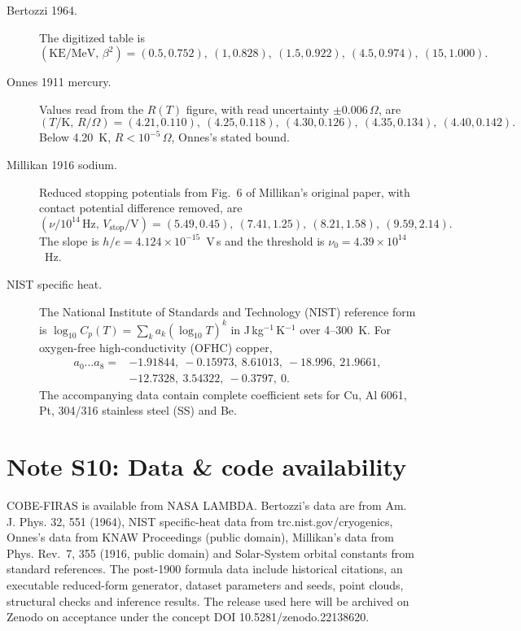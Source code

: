 \documentclass{article}
\begin{document}
\begin{description}
\item[Bertozzi 1964.] The digitized table is
\[
(\mathrm{KE}/\mathrm{MeV},\, \beta^{2}) = (0.5, 0.752),\ (1, 0.828),\ (1.5, 0.922),\
(4.5, 0.974),\ (15, 1.000).
\]
\item[Onnes 1911 mercury.] Values read from the $R(T)$ figure, with read uncertainty
$\pm 0.006\,\Omega$, are
\[
(T/\mathrm{K},\, R/\Omega) = (4.21, 0.110),\ (4.25, 0.118),\ (4.30, 0.126),\
(4.35, 0.134),\ (4.40, 0.142).
\]
Below 4.20~K, $R < 10^{-5}\,\Omega$, Onnes's stated bound.
\item[Millikan 1916 sodium.] Reduced stopping potentials from Fig.~6 of Millikan's
original paper, with contact potential difference removed, are
\[
(\nu/10^{14}\,\mathrm{Hz},\, V_{\mathrm{stop}}/\mathrm{V}) = (5.49, 0.45),\ (7.41, 1.25),\
(8.21, 1.58),\ (9.59, 2.14).
\]
The slope is $h/e = 4.124\times10^{-15}$~V\,s and the
threshold is $\nu_{0} = 4.39\times10^{14}$~Hz.
\item[NIST specific heat.] The National Institute of Standards and Technology (NIST) reference form is
$\log_{10} C_p(T) = \sum_k a_k (\log_{10} T)^{k}$ in J\,kg$^{-1}$\,K$^{-1}$ over
4--300~K. For oxygen-free high-conductivity (OFHC) copper,
\begin{align*}
a_0 \ldots a_8 = {}& -1.91844,\ -0.15973,\ 8.61013,\ -18.996,\ 21.9661,\\
& -12.7328,\ 3.54322,\ -0.3797,\ 0.
\end{align*}
The accompanying data contain
complete coefficient sets for Cu, Al 6061, Pt, 304/316 stainless steel (SS) and Be.
\end{description}

\section{Note S10: Data \& code availability}

COBE-FIRAS is available from NASA LAMBDA. Bertozzi's data are from Am. J. Phys. 32, 551 (1964), NIST specific-heat data from trc.nist.gov/cryogenics, Onnes's data from KNAW Proceedings (public domain), Millikan's data from Phys. Rev.~7, 355 (1916, public domain) and Solar-System orbital constants from standard references. The post-1900 formula data include historical citations, an executable reduced-form generator, dataset parameters and seeds, point clouds, structural checks and inference results. The release used here will be archived on Zenodo on acceptance under the concept DOI 10.5281/zenodo.22138620.
\end{document}
